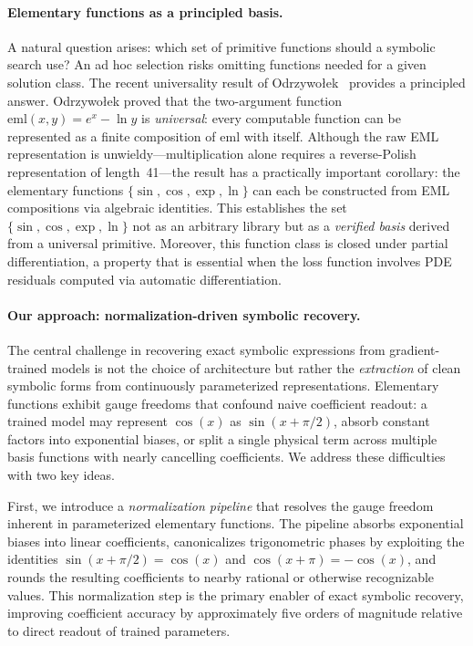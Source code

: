 \paragraph{Elementary functions as a principled basis.}
A natural question arises: which set of primitive functions should a symbolic
search use?  An ad hoc selection risks omitting functions needed for a given
solution class.  The recent universality result of
Odrzywo{\l}ek~\cite{odrzywołek2026} provides a principled answer.
Odrzywo{\l}ek proved that the two-argument function
$\mathrm{eml}(x,y) = e^{x} - \ln y$ is \emph{universal}: every computable
function can be represented as a finite composition of $\mathrm{eml}$ with
itself.  Although the raw EML representation is unwieldy---multiplication alone
requires a reverse-Polish representation of length~41---the result has a
practically important corollary: the elementary functions $\{\sin, \cos, \exp,
\ln\}$ can each be constructed from EML compositions via algebraic identities.
This establishes the set $\{\sin, \cos, \exp, \ln\}$ not as an arbitrary
library but as a \emph{verified basis} derived from a universal primitive.
Moreover, this function class is closed under partial differentiation, a
property that is essential when the loss function involves PDE residuals
computed via automatic differentiation.

\paragraph{Our approach: normalization-driven symbolic recovery.}
The central challenge in recovering exact symbolic expressions from
gradient-trained models is not the choice of architecture but rather the
\emph{extraction} of clean symbolic forms from continuously parameterized
representations.  Elementary functions exhibit gauge freedoms that confound
naive coefficient readout: a trained model may represent $\cos(x)$ as
$\sin(x + \pi/2)$, absorb constant factors into exponential biases, or split a
single physical term across multiple basis functions with nearly cancelling
coefficients.  We address these difficulties with two key ideas.

First, we introduce a \emph{normalization pipeline} that resolves the gauge
freedom inherent in parameterized elementary functions.  The pipeline absorbs
exponential biases into linear coefficients, canonicalizes trigonometric phases
by exploiting the identities $\sin(x + \pi/2) = \cos(x)$ and
$\cos(x + \pi) = -\cos(x)$, and rounds the resulting coefficients to nearby
rational or otherwise recognizable values.  This normalization step is the
primary enabler of exact symbolic recovery, improving coefficient accuracy by
approximately five orders of magnitude relative to direct readout of trained
parameters.

